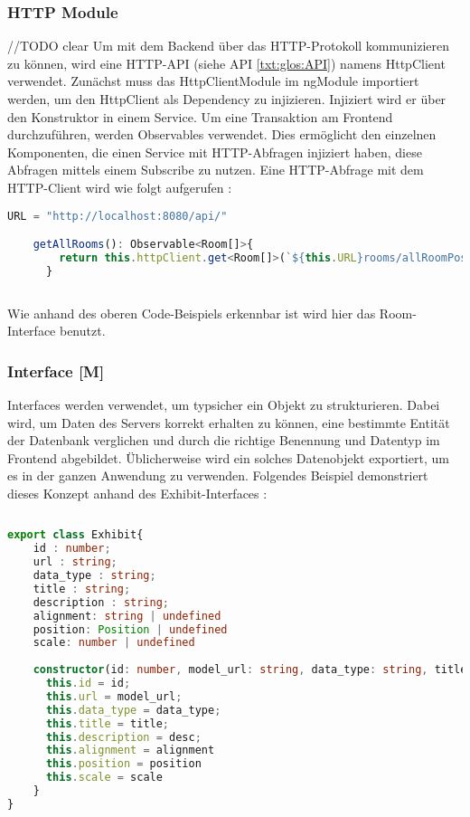 \subsubsection{HTTP Module}
//TODO clear
\label{httpService}
\label{sec:HTTPModule}
Um mit dem Backend über das HTTP-Protokoll kommunizieren zu können, wird eine HTTP-API (siehe API \ref{txt:glos:API}) namens HttpClient verwendet. Zunächst muss das HttpClientModule im ngModule importiert werden, um den HttpClient als Dependency zu injizieren. Injiziert wird er über den Konstruktor in einem Service. Um eine Transaktion am Frontend durchzuführen, werden Observables verwendet. Dies ermöglicht den einzelnen Komponenten, die einen Service mit HTTP-Abfragen injiziert haben, diese Abfragen mittels einem Subscribe zu nutzen. Eine HTTP-Abfrage mit dem HTTP-Client wird wie folgt aufgerufen \cite{AngularBuch} \cite{AngularHTTPClient}:

\begin{lstlisting}[caption={HttpClient Abfragen},  language=TypeScript,label=lst:impl:httpclientrequests]   
    URL = "http://localhost:8080/api/"

    getAllRooms(): Observable<Room[]>{
        return this.httpClient.get<Room[]>(`${this.URL}rooms/allRoomPositions`);
      }
    
\end{lstlisting}

Wie anhand des oberen Code-Beispiels erkennbar ist wird hier das Room-Interface benutzt.

\subsubsection{Interface [M]}
\label{interface}
Interfaces werden verwendet, um typsicher ein Objekt zu strukturieren. Dabei wird, um Daten des Servers korrekt erhalten zu können, eine bestimmte Entität der Datenbank verglichen und durch die richtige Benennung und Datentyp im Frontend abgebildet. Üblicherweise wird ein solches Datenobjekt exportiert, um es in der ganzen Anwendung zu verwenden. Folgendes Beispiel demonstriert dieses Konzept anhand des Exhibit-Interfaces \cite{AngularBuch}: 

\begin{lstlisting}[caption={Das Datenmodell eines Ausstelungsstückes},  language=TypeScript,label=lst:impl:httpclientrequests]   
  
export class Exhibit{
    id : number;
    url : string;
    data_type : string;
    title : string;
    description : string;
    alignment: string | undefined
    position: Position | undefined
    scale: number | undefined
  
    constructor(id: number, model_url: string, data_type: string, title: string, desc: string, alignment: string | undefined, position: Position | undefined, scale: number | undefined) {
      this.id = id;
      this.url = model_url;
      this.data_type = data_type;
      this.title = title;
      this.description = desc;
      this.alignment = alignment
      this.position = position
      this.scale = scale
    }
}
\end{lstlisting}

